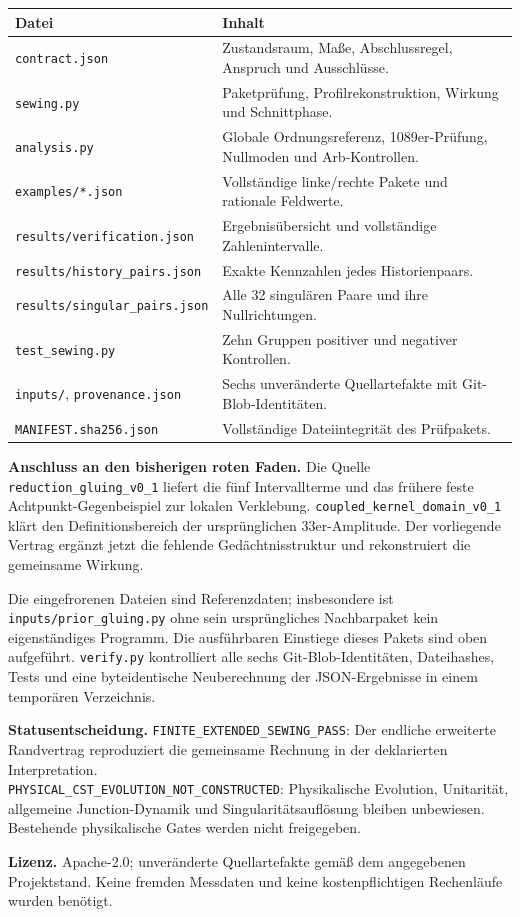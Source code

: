 \documentclass[10pt,a4paper]{article}
\begin{document}
\begin{center}\begin{tabular}{p{.39\linewidth}p{.52\linewidth}}\toprule
Datei & Inhalt\\\midrule
\texttt{contract.json} & Zustandsraum, Maße, Abschlussregel, Anspruch und Ausschlüsse.\\
\texttt{sewing.py} & Paketprüfung, Profilrekonstruktion, Wirkung und Schnittphase.\\
\texttt{analysis.py} & Globale Ordnungsreferenz, 1089er-Prüfung, Nullmoden und Arb-Kontrollen.\\
\texttt{examples/*.json} & Vollständige linke/rechte Pakete und rationale Feldwerte.\\
\texttt{results/verification.json} & Ergebnisübersicht und vollständige Zahlenintervalle.\\
\texttt{results/history\_pairs.json} & Exakte Kennzahlen jedes Historienpaars.\\
\texttt{results/singular\_pairs.json} & Alle 32 singulären Paare und ihre Nullrichtungen.\\
\texttt{test\_sewing.py} & Zehn Gruppen positiver und negativer Kontrollen.\\
\texttt{inputs/}, \texttt{provenance.json} & Sechs unveränderte Quellartefakte mit Git-Blob-Identitäten.\\
\texttt{MANIFEST.sha256.json} & Vollständige Dateiintegrität des Prüfpakets.\\\bottomrule
\end{tabular}\end{center}

\textbf{Anschluss an den bisherigen roten Faden.}
Die Quelle \texttt{reduction\_gluing\_v0\_1} liefert die fünf Intervallterme
und das frühere feste Achtpunkt-Gegenbeispiel zur lokalen Verklebung.
\texttt{coupled\_kernel\_domain\_v0\_1} klärt den Definitionsbereich der
ursprünglichen 33er-Amplitude. Der vorliegende Vertrag ergänzt jetzt
die fehlende Gedächtnisstruktur und rekonstruiert die gemeinsame Wirkung.

Die eingefrorenen Dateien sind Referenzdaten; insbesondere ist
\texttt{inputs/prior\_gluing.py} ohne sein ursprüngliches Nachbarpaket
kein eigenständiges Programm. Die ausführbaren Einstiege dieses Pakets
sind oben aufgeführt. \texttt{verify.py} kontrolliert alle sechs
Git-Blob-Identitäten, Dateihashes, Tests und eine byteidentische
Neuberechnung der JSON-Ergebnisse in einem temporären Verzeichnis.

\textbf{Statusentscheidung.}
\texttt{FINITE\_EXTENDED\_SEWING\_PASS}: Der endliche erweiterte Randvertrag
reproduziert die gemeinsame Rechnung in der deklarierten Interpretation.\\
\texttt{PHYSICAL\_CST\_EVOLUTION\_NOT\_CONSTRUCTED}: Physikalische
Evolution, Unitarität, allgemeine Junction-Dynamik und Singularitätsauflösung
bleiben unbewiesen. Bestehende physikalische Gates werden nicht freigegeben.

\textbf{Lizenz.} Apache-2.0; unveränderte Quellartefakte gemäß dem
angegebenen Projektstand. Keine fremden Messdaten und keine kostenpflichtigen
Rechenläufe wurden benötigt.
\end{document}
